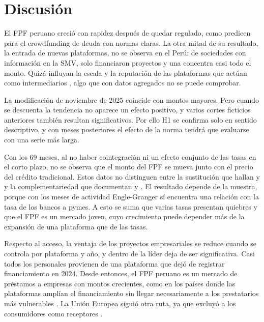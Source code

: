 \section{Discusión}

El FPF peruano creció con rapidez después de quedar regulado, como predicen \textcite{ran2025} para el crowdfunding de deuda con normas claras. La otra mitad de su resultado, la entrada de nuevas plataformas, no se observa en el Perú: de  sociedades con información en la SMV, solo  financiaron proyectos y una concentra casi todo el monto. Quizá influyan la escala y la reputación de las plataformas que actúan como intermediarios \parencite{braggion2025}, algo que con datos agregados no se puede comprobar.

La modificación de noviembre de 2025 coincide con montos mayores. Pero cuando se descuenta la tendencia no aparece un efecto positivo, y varios cortes ficticios anteriores también resultan significativos. Por ello H1 se confirma solo en sentido descriptivo, y con  meses posteriores el efecto de la norma tendrá que evaluarse con una serie más larga.

Con los 69 meses, al no haber cointegración ni un efecto conjunto de las tasas en el corto plazo, no se observa que el monto del FPF se mueva junto con el precio del crédito tradicional. Estos datos no distinguen entre la sustitución que hallan \textcite{kim2026} y \textcite{bennaceur2026} y la complementariedad que documentan \textcite{beaumont2026} y \textcite{eid2024}. El resultado depende de la muestra, porque con los meses de actividad Engle-Granger sí encuentra una relación con la tasa de los bancos a pymes. A esto se suma que varias tasas presentan quiebres y que el FPF es un mercado joven, cuyo crecimiento puede depender más de la expansión de una plataforma que de las tasas.

Respecto al acceso, la ventaja de los proyectos empresariales se reduce cuando se controla por plataforma y año, y dentro de la líder deja de ser significativa. Casi todos los personales provienen de una plataforma que dejó de registrar financiamiento en 2024. Desde entonces, el FPF peruano es un mercado de préstamos a empresas con montos crecientes, como en los países donde las plataformas amplían el financiamiento sin llegar necesariamente a los prestatarios más vulnerables \parencite{fareed2025}. La Unión Europea siguió otra ruta, ya que excluyó a los consumidores como receptores \parencite{morello2025}.

